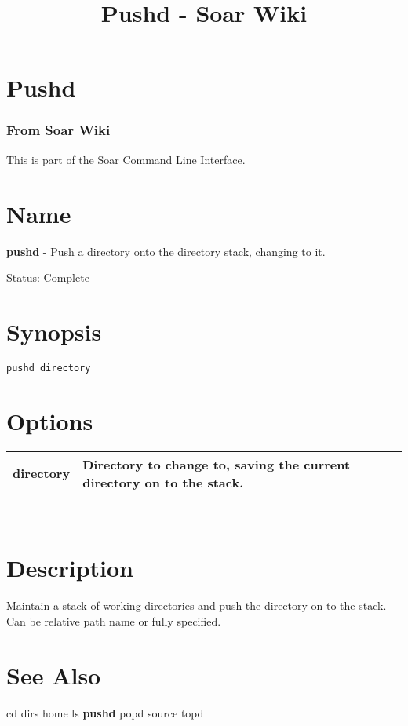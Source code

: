 \documentclass[10pt]{article}
\title{Pushd - Soar Wiki}
\begin{document}
\section*{Pushd}
\subsubsection*{From Soar Wiki}


 This is part of the Soar Command Line Interface. 
\section*{ Name }


 \textbf{pushd}
 - Push a directory onto the directory stack, changing to it. 


 Status: Complete
\section*{ Synopsis }
\begin{verbatim}
pushd directory

\end{verbatim}
\section*{ Options }


\begin{tabular}{|p{1in}|p{5in}|}
\hline 
 directory  & Directory to change to, saving the current directory on to the stack.  \\
 \hline 

\end{tabular}



 \\ 

\section*{ Description }


 Maintain a stack of working directories and push the directory on to the stack. Can be relative path name or fully specified. 
\section*{ See Also }
\begin{description}
cd dirs home ls \textbf{pushd}
 popd source topd

\end{description}
\end{document}
